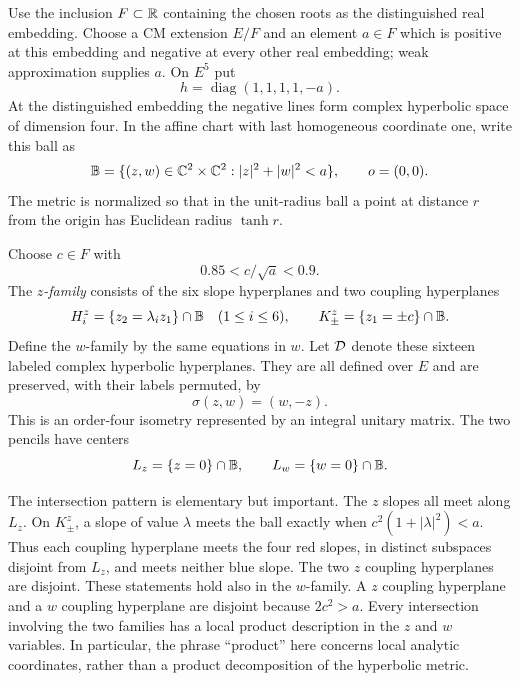 Use the inclusion $F\subset\mathbb R$ containing the chosen roots as the
distinguished real embedding.  Choose a CM extension $E/F$ and an
element $a\in F$ which is positive at this embedding and negative at
every other real embedding; weak approximation supplies $a$.  On $E^5$ put
\begin{equation}\label{geo:hermitian}
 h=\operatorname{diag}(1,1,1,1,-a).
\end{equation}
At the distinguished embedding the negative lines form complex
hyperbolic space of dimension four.  In the affine chart with last
homogeneous coordinate one, write this ball as
\[
 \mathbb B=\{(z,w)\in\mathbb C^2\times\mathbb C^2:|z|^2+|w|^2<a\},
 \qquad o=(0,0).
\]
The metric is normalized so that in the unit-radius ball a point at
distance $r$ from the origin has Euclidean radius $\tanh r$.

Choose $c\in F$ with
\begin{equation}\label{geo:coupling-size}
                 0.85<c/\sqrt a<0.9.
\end{equation}
The \emph{$z$-family} consists of the six slope hyperplanes and two
coupling hyperplanes
\[
 H^z_i=\{z_2=\lambda_i z_1\}\cap\mathbb B\quad(1\le i\le6),
 \qquad K^z_\pm=\{z_1=\pm c\}\cap\mathbb B.
\]
Define the $w$-family by the same equations in $w$.  Let $\mathcal D$ denote
these sixteen labeled complex hyperbolic hyperplanes.  They are all
defined over $E$ and are preserved, with their labels permuted, by
\begin{equation}\label{geo:sigma}
                    \sigma(z,w)=(w,-z).
\end{equation}
This is an order-four isometry represented by an integral unitary
matrix.  The two pencils have centers
\[
 L_z=\{z=0\}\cap\mathbb B,
 \qquad L_w=\{w=0\}\cap\mathbb B.
\]

The intersection pattern is elementary but important.  The $z$ slopes
all meet along $L_z$.  On $K^z_\pm$, a slope of value $\lambda$ meets the
ball exactly when $c^2(1+|\lambda|^2)<a$.  Thus each coupling hyperplane
meets the four red slopes, in distinct subspaces disjoint from $L_z$,
and meets neither blue slope.  The two $z$ coupling hyperplanes are
disjoint.  These statements hold also in the $w$-family.  A $z$ coupling
hyperplane and a $w$ coupling hyperplane are disjoint because $2c^2>a$.
Every intersection involving the two families has a local product
description in the $z$ and $w$ variables.  In particular, the phrase
``product'' here concerns local analytic coordinates, rather than a
product decomposition of the hyperbolic metric.

